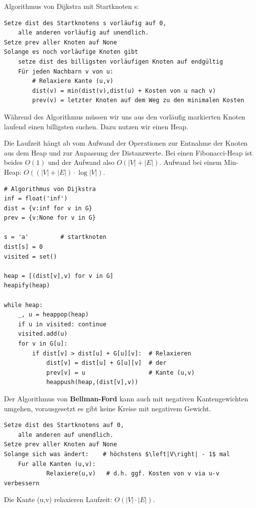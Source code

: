 \begin{frame}[fragile]
Algorithmus von Dijkstra mit Startknoten s:
\begin{lstlisting}[basicstyle=\scriptsize]
Setze dist des Startknotens s vorläufig auf 0,
    alle anderen vorläufig auf unendlich. 
Setze prev aller Knoten auf None
Solange es noch vorläufige Knoten gibt
    setze dist des billigsten vorläufigen Knoten auf endgültig
    Für jeden Nachbarn v von u:   
        # Relaxiere Kante (u,v) 
        dist(v) = min(dist(v),dist(u) + Kosten von u nach v) 
        prev(v) = letzter Knoten auf dem Weg zu den minimalen Kosten
\end{lstlisting} \pause

Während des Algorithmus müssen wir uns aus den vorläufig markierten Knoten laufend einen billigsten suchen. \pause
Dazu nutzen wir einen Heap. \pause

Die Laufzeit hängt ab vom Aufwand der Operationen  zur Entnahme der Knoten aus dem Heap und zur Anpassung
der Distanzwerte. Bei einen Fibonacci-Heap ist beides $O(1)$ und der Aufwand also $O(\left|V\right|+\left|E\right|)$.
Aufwand bei einem Min-Heap: $O((\left|V\right|+\left|E\right|)\cdot\log\left|V\right|)$.
\end{frame}

\begin{frame}[fragile]
\begin{lstlisting}[basicstyle=\scriptsize]
# Algorithmus von Dijkstra
inf = float('inf')
dist = {v:inf for v in G}
prev = {v:None for v in G}

s = 'a'         # startknoten
dist[s] = 0
visited = set()

heap = [(dist[v],v) for v in G]
heapify(heap)
 
while heap:
    _, u = heappop(heap)
    if u in visited: continue
    visited.add(u)
    for v in G[u]:
        if dist[v] > dist[u] + G[u][v]:  # Relaxieren 
            dist[v] = dist[u] + G[u][v]  # der 
            prev[v] = u                  # Kante (u,v)
            heappush(heap,(dist[v],v))
\end{lstlisting}

\end{frame}

\begin{frame}[fragile]
Der Algorithmus von \textbf{Bellman-Ford} kann auch mit negativen Kantengewichten umgehen, vorausgesetzt
es gibt keine Kreise mit negativem Gewicht.

\begin{lstlisting}[basicstyle=\scriptsize]
Setze dist des Startknotens auf 0,
    alle anderen auf unendlich. 
Setze prev aller Knoten auf None
Solange sich was ändert:    # höchstens $\left|V\right| - 1$ mal
	Fur alle Kanten (u,v):
            Relaxiere(u,v)   # d.h. ggf. Kosten von v via u-v verbessern
\end{lstlisting} \pause

Die Kante (u,v) relaxieren 
Laufzeit: $O(\left|V\right|\cdot\left|E\right|)$.

\end{frame}

